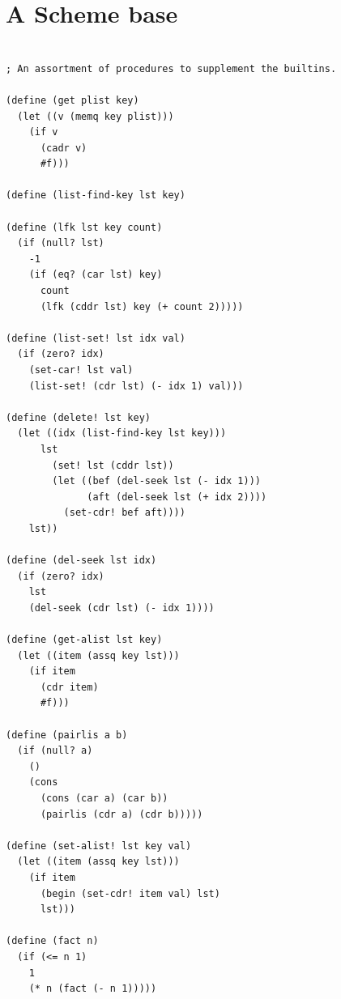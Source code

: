\documentclass[twoside,9pt]{report}
\begin{document}
\chapter{A Scheme base}
\label{a-scheme-base}
\noindent\makebox[\linewidth]{\rule{\linewidth}{0.4pt}}
\begin{lstlisting}
 
; An assortment of procedures to supplement the builtins.
 
(define (get plist key)
  (let ((v (memq key plist)))
    (if v
      (cadr v)
      #f)))
 
(define (list-find-key lst key)
 
(define (lfk lst key count)
  (if (null? lst)
    -1
    (if (eq? (car lst) key)
      count
      (lfk (cddr lst) key (+ count 2)))))
 
(define (list-set! lst idx val)
  (if (zero? idx)
    (set-car! lst val)
    (list-set! (cdr lst) (- idx 1) val)))
 
(define (delete! lst key)
  (let ((idx (list-find-key lst key)))
      lst
        (set! lst (cddr lst))
        (let ((bef (del-seek lst (- idx 1)))
              (aft (del-seek lst (+ idx 2))))
          (set-cdr! bef aft))))
    lst))
 
(define (del-seek lst idx)
  (if (zero? idx)
    lst
    (del-seek (cdr lst) (- idx 1))))
 
(define (get-alist lst key)
  (let ((item (assq key lst)))
    (if item
      (cdr item)
      #f)))
 
(define (pairlis a b)
  (if (null? a)
    ()
    (cons
      (cons (car a) (car b))
      (pairlis (cdr a) (cdr b)))))
 
(define (set-alist! lst key val)
  (let ((item (assq key lst)))
    (if item
      (begin (set-cdr! item val) lst)
      lst)))
 
(define (fact n)
  (if (<= n 1)
    1
    (* n (fact (- n 1)))))
 
\end{lstlisting}
\noindent\makebox[\linewidth]{\rule{\linewidth}{0.4pt}}
\end{document}
